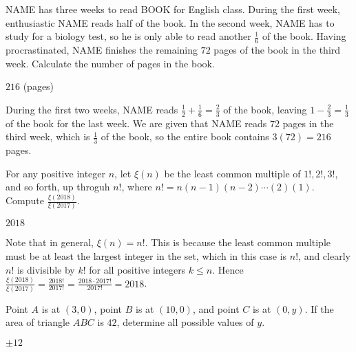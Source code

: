 \documentclass[11pt]{article}
\begin{document}
\begin{problem}
NAME has three weeks to read BOOK for English class. During the first week, 
enthusiastic NAME reads half of the book. In the second week, NAME has to study for a biology test, 
so he is only able to read another $\frac{1}{6}$ of the book. Having procrastinated, 
NAME finishes the remaining $72$ pages of the book in the third week. Calculate the number of pages in the book.
\end{problem}

\begin{answer}
$\boxed{216}$ (pages)
\end{answer}

\begin{solution}
During the first two weeks, NAME reads $\frac{1}{2} + \frac{1}{6} = \frac{2}{3}$ of the book, leaving
$1 - \frac{2}{3} = \frac{1}{3}$ of the book for the last week. We are given that NAME reads $72$ pages in
the third week, which is $\frac{1}{3}$ of the book, so the entire book contains $3(72) = \boxed{216}$ pages.
\end{solution}


\begin{problem}%
For any positive integer $n$, let $\xi(n)$ be the least common multiple of $1!, 2!, 3!$, and so
forth, up throguh $n!$, where $n! = n(n-1)(n-2) \cdots (2)(1)$. Compute $\frac{\xi(2018)}{\xi(2017)}$.
\end{problem}

\begin{answer}
$\boxed{2018}$
\end{answer}

\begin{solution}
Note that in general, $\xi(n) = n!$. This is because the least common multiple must be at least
the largest integer in the set, which in this case is $n!$, and clearly $n!$ is divisible
by $k!$ for all positive integers $k \le n$. Hence $\frac{\xi(2018)}{\xi(2017)} =
\frac{2018!}{2017!} = \frac{2018 \cdot 2017!}{2017!} = \boxed{2018}$.
\end{solution}


\begin{problem}
Point $A$ is at $(3, 0)$, point $B$ is at $(10, 0)$, and point $C$ is at $(0, y)$.
If the area of triangle $ABC$ is $42$, determine all possible values of $y$.
\end{problem}

\begin{answer}
$\boxed{\pm 12}$
\end{answer}
\end{document}

